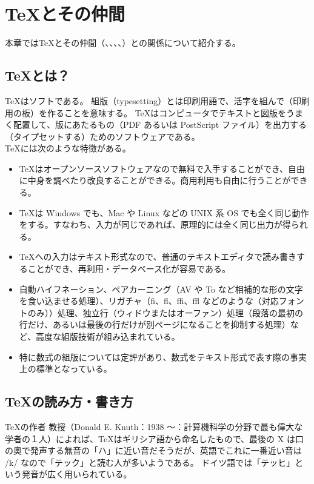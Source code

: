 \chapter{\TeX{}とその仲間}
本章では\TeX{}とその仲間（\pdfTeX、\XeTeX、\LuaTeX、\pTeX、\upTeX）との関係について紹介する。
\section{\TeX{}とは？}
\TeX{}はソフトである。
組版（typesetting）とは印刷用語で、活字を組んで（印刷用の板）を作ることを意味する。
\TeX{}はコンピュータでテキストと図版をうまく配置して、版にあたるもの（PDF あるいは PostScript ファイル）を出力する（タイプセットする）ためのソフトウェアである。\\

\TeX{}には次のような特徴がある。
\begin{itemize}\setlength{\leftskip}{-1.00zw}%
\item \TeX{}はオープンソースソフトウェアなので無料で入手することができ、自由に中身を調べたり改良することができる。商用利用も自由に行うことができる。
\item \TeX{}は Windows でも、Mac や Linux などの UNIX 系 OS でも全く同じ動作をする。すなわち、入力が同じであれば、原理的には全く同じ出力が得られる。
\item \TeX{}への入力はテキスト形式なので、普通のテキストエディタで読み書きすることができ、再利用・データベース化が容易である。
\item 自動ハイフネーション、ペアカーニング（AV や To など相補的な形の文字を食い込ませる処理）、リガチャ（fi、fl、ffi、ffl などのような（対応フォントのみ））処理、独立行（ウィドウまたはオーファン）処理（段落の最初の行だけ、あるいは最後の行だけが別ページになることを抑制する処理）など、高度な組版技術が組み込まれている。
\item 特に数式の組版については定評があり、数式をテキスト形式で表す際の事実上の標準となっている。
\end{itemize}
\section{\TeX{}の読み方・書き方}
\TeX{}の作者  教授（Donald E. Knuth：1938 ～：計算機科学の分野で最も偉大な学者の１人）によれば、\TeX{}はギリシア語から命名したもので、最後の X は口の奥で発声する無音の「ハ」に近い音だそうだが、英語でこれに一番近い音は /k/ なので「テック」と読む人が多いようである。
ドイツ語では「テッヒ」という発音が広く用いられている。\\

